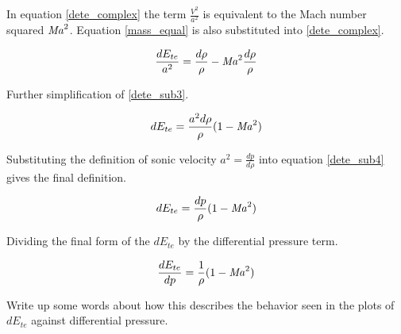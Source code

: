 \documentclass[../ellis_thesis.tex]{subfiles}
\begin{document}
In equation \eqref{dete_complex} the term $\frac{V^2}{a^2}$ is equivalent to the Mach number squared $\mbox{\textit{Ma}}^2$. Equation \eqref{mass_equal} is also substituted into \eqref{dete_complex}.



\begin{equation}
\frac{dE_{te}}{a^2} = \frac{d\rho}{\rho} - \mbox{\textit{Ma}}^2\frac{d\rho}{\rho}
\label{dete_sub3} 
\end{equation}

Further simplification of \eqref{dete_sub3}.

\begin{equation}
dE_{te} = \frac{a^2d\rho}{\rho}(1 - \mbox{\textit{Ma}}^2)
\label{dete_sub4}    
\end{equation}

Substituting the definition of sonic velocity $a^2 = \frac{dp}{d\rho}$ into equation \eqref{dete_sub4} gives the final definition.

\begin{equation}
dE_{te} = \frac{dp}{\rho}(1 - \mbox{\textit{Ma}}^2)
\label{tee_final}    
\end{equation}

Dividing the final form of the $dE_{te}$ by the differential pressure term.

\begin{equation}
\frac{dE_{te}}{dp} = \frac{1}{\rho}(1 - \mbox{\textit{Ma}}^2)
\end{equation}

Write up some words about how this describes the behavior seen in the plots of $dE_{te}$ against differential pressure.
\end{document}
